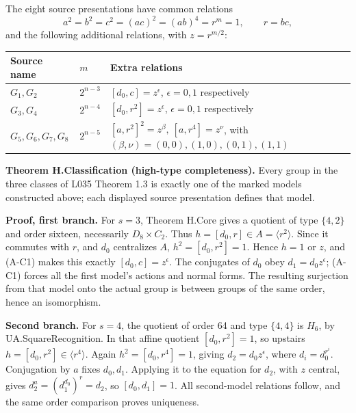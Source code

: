 The eight source presentations have common relations \[
 a^2=b^2=c^2=(ac)^2=(ab)^4=r^m=1,\qquad r=bc,
\] and the following additional relations, with \(z=r^{m/2}\):

{\def\LTcaptype{none} %
\begin{longtable}[]{@{}
  >{\raggedright\arraybackslash}p{}
  >{\raggedright\arraybackslash}p{}
  >{\raggedright\arraybackslash}p{}@{}}
\toprule\noalign{}
\begin{minipage}[b]{\linewidth}\raggedright
Source name
\end{minipage} & \begin{minipage}[b]{\linewidth}\raggedright
\(m\)
\end{minipage} & \begin{minipage}[b]{\linewidth}\raggedright
Extra relations
\end{minipage} \\
\midrule\noalign{}
\endhead
\bottomrule\noalign{}
\endlastfoot
\(G_1,G_2\) & \(2^{n-3}\) & \([d_0,c]=z^\epsilon\), \(\epsilon=0,1\) respectively \\
\(G_3,G_4\) & \(2^{n-4}\) & \([d_0,r^2]=z^\epsilon\), \(\epsilon=0,1\) respectively \\
\(G_5,G_6,G_7,G_8\) & \(2^{n-5}\) & \([a,r^2]^2=z^\beta,\ [a,r^4]=z^\nu\), with \((\beta,\nu)=(0,0),(1,0),(0,1),(1,1)\) \\
\end{longtable}
}

\textbf{Theorem H.Classification (high-type completeness).} Every group in the three classes of L035 Theorem 1.3 is exactly one of the marked models constructed above; each displayed source presentation defines that model.

\textbf{Proof, first branch.} For \(s=3\), Theorem H.Core gives a quotient of type \(\{4,2\}\) and order sixteen, necessarily \(D_8\times C_2\). Thus \(h=[d_0,r]\in A=\langle r^2\rangle\). Since it commutes with \(r\), and \(d_0\) centralizes \(A\), \(h^2=[d_0,r^2]=1\). Hence \(h=1\) or \(z\), and (A-C1) makes this exactly \([d_0,c]=z^\epsilon\). The conjugates of \(d_0\) obey \(d_1=d_0z^\epsilon\); (A-C1) forces all the first model's actions and normal forms. The resulting surjection from that model onto the actual group is between groups of the same order, hence an isomorphism.

\textbf{Second branch.} For \(s=4\), the quotient of order 64 and type \(\{4,4\}\) is \(H_6\), by UA.Square\allowbreak Recognition. In that affine quotient \([d_0,r^2]=1\), so upstairs \(h=[d_0,r^2]\in\langle r^4\rangle\). Again \(h^2=[d_0,r^4]=1\), giving \(d_2=d_0z^\epsilon\), where \(d_i=d_0^{r^i}\). Conjugation by \(a\) fixes \(d_0,d_1\). Applying it to the equation for \(d_2\), with \(z\) central, gives \(d_2^a=(d_1^{d_0})^r=d_2\), so \([d_0,d_1]=1\). All second-model relations follow, and the same order comparison proves uniqueness.

